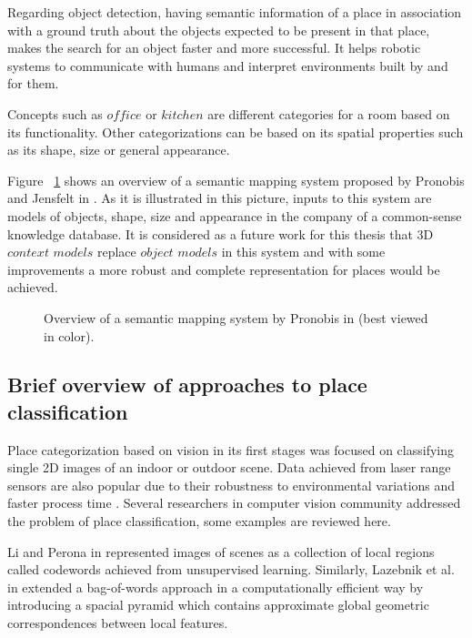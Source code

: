 Regarding object detection, having semantic information of a place in association with a ground truth about the objects expected
to be present in that place, makes the search for an object faster and more successful.
It helps robotic systems to communicate with humans and interpret environments built by and for them.

Concepts such as $office$ or $kitchen$ are different categories for a room based on its functionality.
Other categorizations can be  based on its spatial properties such as its shape, size or general appearance.

Figure ~\ref{semanticmapping.figure} shows an overview of a semantic mapping system proposed by Pronobis and Jensfelt in \cite{pronobis2011phd}.
As it is illustrated in this picture, inputs to this system are models of objects, shape, size and appearance in the company of a 
common-sense knowledge database.
It is considered as a future work for this thesis that 3D $context$ $models$ replace $object$ $models$ in this system and with some improvements 
a more robust and complete representation for places would be achieved.

\begin{figure}[t]
  \caption[Overview of a semantic mapping system]
  {Overview of a semantic mapping system by Pronobis in \cite{pronobis2011phd}(best viewed in color).}
  \label{semanticmapping.figure}
\end{figure}

\subsection{Brief overview of approaches to place classification}
\label{OverviewPlaceClassification.sec}
 Place categorization based on vision in its first stages was focused on classifying single 2D images of an indoor or 
 outdoor scene.
 Data achieved from laser range sensors are also popular due to their robustness to environmental variations and faster process time
 \cite{pronobis2011phd}.
 Several researchers in computer vision community addressed the problem of place classification, some examples are 
 reviewed here.
 
 Li and Perona in \cite{Li:2005:BHM:1068508.1069129} represented images of scenes as a collection of local regions 
 called codewords achieved from unsupervised learning. 
 Similarly, Lazebnik et al. in \cite{1641019} extended a bag-of-words approach in a computationally efficient way
 by introducing a spacial pyramid which contains approximate global geometric correspondences between local features.
  
